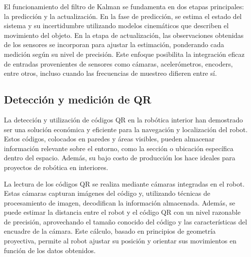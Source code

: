 El funcionamiento del filtro de Kalman se fundamenta en dos etapas principales: la predicción y la actualización. En la fase de predicción, se estima el estado del sistema y su incertidumbre utilizando modelos cinemáticos que describen el movimiento del objeto. En la etapa de actualización, las observaciones obtenidas de los sensores se incorporan para ajustar la estimación, ponderando cada medición según su nivel de precisión. Este enfoque posibilita la integración eficaz de entradas provenientes de sensores como cámaras, acelerómetros, encoders, entre otros, incluso cuando las frecuencias de muestreo difieren entre sí. \cite{nuaimisurveyindoorpositioning}


\subsection{Detección y medición de QR}

La detección y utilización de códigos QR en la robótica interior han demostrado ser una solución económica y eficiente para la navegación y localización del robot. Estos códigos, colocados en paredes y áreas visibles, pueden almacenar información relevante sobre el entorno, como la sección o ubicación específica dentro del espacio. Además, su bajo costo de producción los hace ideales para proyectos de robótica en interiores. \cite{tzafestas2013introduction}

La lectura de los códigos QR se realiza mediante cámaras integradas en el robot. Estas cámaras capturan imágenes del código y, utilizando técnicas de procesamiento de imagen, decodifican la información almacenada. Además, se puede estimar la distancia entre el robot y el código QR con un nivel razonable de precisión, aprovechando el tamaño conocido del código y las características del encuadre de la cámara. Este cálculo, basado en principios de geometría proyectiva, permite al robot ajustar su posición y orientar sus movimientos en función de los datos obtenidos.

